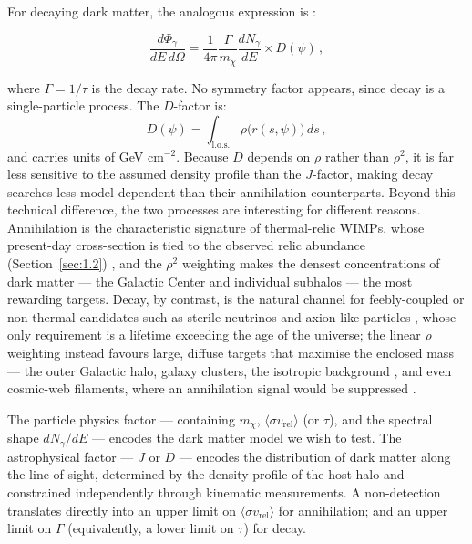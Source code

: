 For decaying dark matter, the analogous expression is \cite{Pinetti:2021jjs}:

\begin{equation}
	\frac{d\Phi_\gamma}{dE\, d\Omega} = \frac{1}{4\pi} \frac{\Gamma}{m_\chi} \frac{dN_\gamma}{dE} \times D(\psi) \,,
	\label{eq:flux_dec}
\end{equation}

where $\Gamma = 1/\tau$ is the decay rate.
No symmetry factor appears, since decay is a single-particle process.
The $D$-factor is:
%
\begin{equation}
	D(\psi) = \int_\text{l.o.s.} \rho\bigl(r(s, \psi)\bigr) \, ds \,,
	\label{eq:dfactor}
\end{equation}
%
and carries units of GeV cm$^{-2}$.
Because $D$ depends on $\rho$ rather than $\rho^2$, it is far less sensitive to the assumed density profile than the $J$-factor, making decay searches less model-dependent than their annihilation counterparts.
Beyond this technical difference, the two processes are interesting for different reasons.
Annihilation is the characteristic signature of thermal-relic WIMPs, whose present-day cross-section is tied to the observed relic abundance (Section~\ref{sec:1.2}) \cite{Bertone:2004pz}, and the $\rho^2$ weighting makes the densest concentrations of dark matter --- the Galactic Center and individual subhalos --- the most rewarding targets.
Decay, by contrast, is the natural channel for feebly-coupled or non-thermal candidates such as sterile neutrinos \cite{Dodelson:1993je,Boyarsky:2018tvu} and axion-like particles \cite{Arias:2012az}, whose only requirement is a lifetime exceeding the age of the universe; the linear $\rho$ weighting instead favours large, diffuse targets that maximise the enclosed mass --- the outer Galactic halo, galaxy clusters, the isotropic background \cite{Ibarra:2013cra}, and even cosmic-web filaments, where an annihilation signal would be suppressed \cite{Pinetti:2021jjs}.

The particle physics factor --- containing $m_\chi$, $\langle \sigma v_\text{rel} \rangle$ (or $\tau$), and the spectral shape $dN_\gamma/dE$ --- encodes the dark matter model we wish to test.
The astrophysical factor --- $J$ or $D$ --- encodes the distribution of dark matter along the line of sight, determined by the density profile of the host halo and constrained independently through kinematic measurements.
A non-detection translates directly into an upper limit on $\langle \sigma v_\text{rel} \rangle$ for annihilation; and an upper limit on $\Gamma$ (equivalently, a lower limit on $\tau$) for decay.

